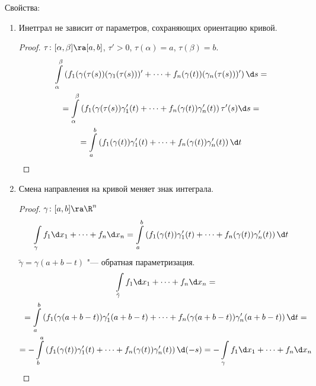 Свойства:
\begin{enumerate}
\item
	Инетграл не зависит от параметров, сохраняющих ориентацию кривой.
	\begin{proof}
		$\tau\colon [\alpha, \beta] \ra [a, b]$, $\tau' > 0$, $\tau(\alpha) = a$, $\tau(\beta) = b$.
		\begin{gather*}
			\int\limits_\alpha^\beta \left(f_1(\gamma(\tau(s))(\gamma_1(\tau(s)))' + \dots + f_n(\gamma(t))(\gamma_n(\tau(s)))' \right) \d s =\\
			= \int\limits_\alpha^\beta \left(f_1(\gamma(\tau(s))\gamma'_1(t) + \dots + f_n(\gamma(t))\gamma'_n(t) \right) \tau'(s) \d s = \\
			= \int\limits_a^b \left(f_1(\gamma(t))\gamma'_1(t) + \dots + f_n(\gamma(t))\gamma'_n(t) \right) \d t
		\end{gather*}
	\end{proof}

\item
	Смена направления на кривой меняет знак интеграла.
	\begin{proof}
		$\gamma\colon [a, b] \ra \R^n$
		\[
			\int\limits_\gamma f_1 \d x_1 + \dots + f_n \d x_n
			= \int\limits_a^b \left(f_1(\gamma(t))\gamma'_1(t) + \dots + f_n(\gamma(t))\gamma'_n(t) \right) \d t
		\]
		$\tilde\gamma = \gamma(a+b-t)$ "--- обратная параметризация.
		\begin{gather*}
			\int\limits_{\tilde\gamma} f_1 \d x_1 + \dots + f_n \d x_n = \\
			= \int\limits_a^b \left(f_1(\gamma(a+b-t))\gamma'_1(a+b-t) + \dots + f_n(\gamma(a+b-t))\gamma'_n(a+b-t) \right) \d t = \\
			= -\int\limits_b^a \left(f_1(\gamma(t))\gamma'_1(t) + \dots + f_n(\gamma(t))\gamma'_n(t) \right) \d (-s)
			= -\int\limits_\gamma f_1 \d x_1 + \dots + f_n \d x_n
		\end{gather*}
	\end{proof}


\end{enumerate}
